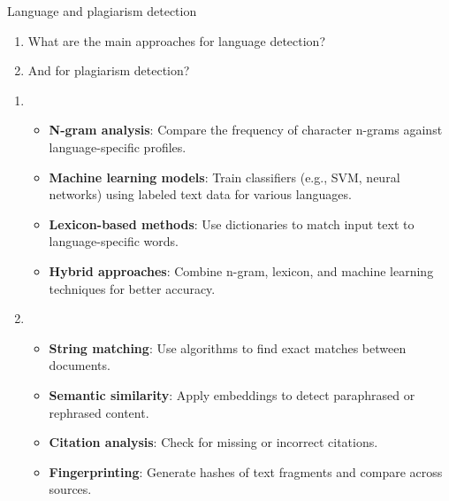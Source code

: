 \documentclass{article}
\begin{document}
\begin{exercise}{Language and plagiarism detection}\label{ex:detect}
  \begin{enumerate}
    \item What are the main approaches for language detection?
    \item And for plagiarism detection?
  \end{enumerate}

  \begin{solution}
    \begin{enumerate}
      \item \begin{itemize}
          \item \textbf{N-gram analysis}: Compare the frequency of character n-grams against language-specific profiles.
          \item \textbf{Machine learning models}: Train classifiers (e.g., SVM, neural networks) using labeled text data for various languages.
          \item \textbf{Lexicon-based methods}: Use dictionaries to match input text to language-specific words.
          \item \textbf{Hybrid approaches}: Combine n-gram, lexicon, and machine learning techniques for better accuracy.
        \end{itemize}
      \item \begin{itemize}
          \item \textbf{String matching}: Use algorithms to find exact matches between documents.
          \item \textbf{Semantic similarity}: Apply embeddings to detect paraphrased or rephrased content.
          \item \textbf{Citation analysis}: Check for missing or incorrect citations.
          \item \textbf{Fingerprinting}: Generate hashes of text fragments and compare across sources.
        \end{itemize}
      \end{enumerate}
  \end{solution}
\end{exercise}
\end{document}

